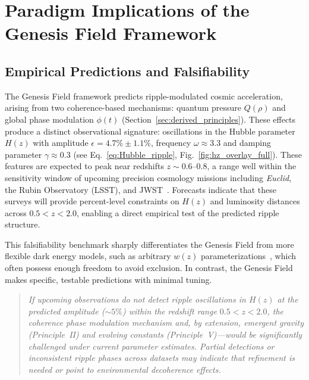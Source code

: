 \section{Paradigm Implications of the Genesis Field Framework}
\label{interpretation}

\subsection{Empirical Predictions and Falsifiability}

The Genesis Field framework predicts ripple-modulated cosmic acceleration, arising from two coherence-based mechanisms: quantum pressure \( Q(\rho) \) and global phase modulation \( \phi(t) \) (Section~\ref{sec:derived_principles}). These effects produce a distinct observational signature: oscillations in the Hubble parameter \( H(z) \) with amplitude \( \epsilon = 4.7\% \pm 1.1\% \), frequency \( \omega \approx 3.3 \) and damping parameter \( \gamma \approx 0.3 \) (see Eq.~\ref{eq:Hubble_ripple}, Fig.~\ref{fig:hz_overlay_full}). These features are expected to peak near redshifts \( z \sim 0.6 \)–\( 0.8 \), a range well within the sensitivity window of upcoming precision cosmology missions including \textit{Euclid}, the Rubin Observatory (LSST), and JWST~\cite{Laureijs2011,LSST2009,Gardner2006}. Forecasts indicate that these surveys will provide percent-level constraints on \( H(z) \) and luminosity distances across \( 0.5 < z < 2.0 \), enabling a direct empirical test of the predicted ripple structure.

This falsifiability benchmark sharply differentiates the Genesis Field from more flexible dark energy models, such as arbitrary \( w(z) \) parameterizations~\cite{Chevallier2001,Linder2003}, which often possess enough freedom to avoid exclusion. In contrast, the Genesis Field makes specific, testable predictions with minimal tuning.

\begin{quote}
\textit{If upcoming observations do not detect ripple oscillations in \( H(z) \) at the predicted amplitude (\( \sim5\% \)) within the redshift range \( 0.5 < z < 2.0 \), the coherence phase modulation mechanism and, by extension, emergent gravity (Principle~II) and evolving constants (Principle~V)—would be significantly challenged under current parameter estimates. Partial detections or inconsistent ripple phases across datasets may indicate that refinement is needed or point to environmental decoherence effects.}
\end{quote}

